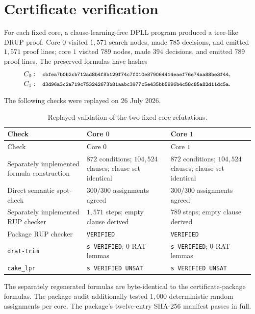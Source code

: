 \documentclass[11pt,a4paper]{article}
\theoremstyle{definition}
\theoremstyle{remark}
\newcommand{\sha}[1]{\texttt{\footnotesize #1}}
\begin{document}
\section{Certificate verification}\label{sec:certificates}

For each fixed core, a clause-learning-free DPLL program produced a
tree-like DRUP proof.  Core \(0\) visited \(1{,}571\) search nodes, made
\(785\) decisions, and emitted \(1{,}571\) proof lines; core \(1\) visited
\(789\) nodes, made \(394\) decisions, and emitted \(789\) proof lines.
The preserved formulas have hashes
\[
\begin{array}{ll}
C_0:&
\sha{cbfea7b0b2cb712ad8b4f8b129f74c7f010e879064414eaef76e74aa88be3f44},\\[0.25em]
C_1:&
\sha{d3d96a3c2a719c753242673b81aabc3977c5e435bb5996b4c58c85a82d11dc5a}.
\end{array}
\]

The following checks were replayed on 26 July 2026.

\begin{longtable}{@{}>{\raggedright\arraybackslash}p{}
>{\raggedright\arraybackslash}p{}
>{\raggedright\arraybackslash}p{}@{}}
\caption{Replayed validation of the two fixed-core refutations.}
\label{tab:verification}\\
\toprule
Check & Core \(0\) & Core \(1\)\\
\midrule
\endfirsthead
\toprule
Check & Core \(0\) & Core \(1\)\\
\midrule
\endhead
Separately implemented formula construction &
\(872\) conditions; \(104{,}524\) clauses; clause set identical &
\(872\) conditions; \(104{,}524\) clauses; clause set identical\\
Direct semantic spot-check &
\(300/300\) assignments agreed &
\(300/300\) assignments agreed\\
Separately implemented RUP checker &
\(1{,}571\) steps; empty clause derived &
\(789\) steps; empty clause derived\\
Package RUP checker &
\texttt{VERIFIED} &
\texttt{VERIFIED}\\
\texttt{drat-trim} \cite{drat-trim} &
\texttt{s VERIFIED}; \(0\) RAT lemmas &
\texttt{s VERIFIED}; \(0\) RAT lemmas\\
\texttt{cake\_lpr} \cite{cake-lpr} &
\texttt{s VERIFIED UNSAT} &
\texttt{s VERIFIED UNSAT}\\
\bottomrule
\end{longtable}

The separately regenerated formulas are byte-identical to the
certificate-package formulas.  The package audit additionally tested
\(1{,}000\) deterministic random assignments per core.  The package's
twelve-entry SHA-256 manifest passes in full.
\end{document}
